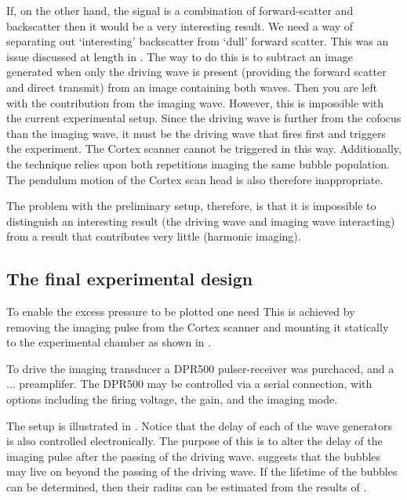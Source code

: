 {  If, on the other hand, the signal is a combination of forward-scatter and backscatter then it would be a very interesting result.  
  We need a way of separating out `interesting' backscatter from `dull' forward scatter.
  This was an issue discussed at length in .
  The way to do this is to subtract an image generated when only the driving wave is present (providing the forward scatter and direct transmit)
  from an image containing both waves.
  Then you are left with the contribution from the imaging wave.
  However, this is impossible with the current experimental setup.
  Since the driving wave is further from the cofocus than the imaging wave,
  it must be the driving wave that fires first and triggers the experiment.
  The Cortex scanner cannot be triggered in this way.
  Additionally, the technique relies upon both repetitions imaging the same bubble population.
  The pendulum motion of the Cortex scan head is also therefore  inappropriate.
}

 The problem with the preliminary setup, therefore,  is that it is impossible to distinguish an interesting result (the driving wave and imaging wave interacting)
 from a result that contributes very little (harmonic imaging).
 



\subsection{The final experimental design} \label{sec:exp:finalDesign}

To enable the excess pressure to be plotted one need
This is achieved by removing the imaging pulse from the Cortex scanner
and mounting it statically to the experimental chamber as shown in .

To drive the imaging transducer a DPR500 pulser-receiver was purchaced,
and a ... preamplifer.
The DPR500 may be controlled via a serial connection,
with options including the firing voltage, the gain,
and the imaging mode.

The setup is illustrated in .
Notice that the delay of each of the wave generators is also controlled electronically.
The purpose of this is to alter the delay of the imaging pulse after the passing of the driving wave.
\Figref{} suggests that the bubbles may live on beyond the passing of the driving wave.
If the lifetime of the bubbles can be determined, then their radius can be estimated 
from the results of .


